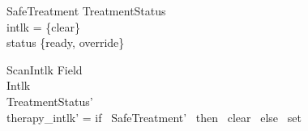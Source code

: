 \begin{schema}{SafeTreatment}
TreatmentStatus \\
\where \ran intlk = \{clear\} \\
\ran status \subseteq \{ready, override\}
\end{schema}

\begin{schema}{ScanIntlk}
\Xi Field \\
\Delta Intlk \\
\where TreatmentStatus' \\
therapy\_intlk' = if \, SafeTreatment' \, then \, clear \, else \,
set
\end{schema}


